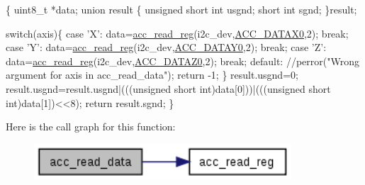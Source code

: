 \begin{DoxyCode}
\{
  uint8\_t *data;
  \textcolor{keyword}{union }result
  \{
    \textcolor{keywordtype}{unsigned} \textcolor{keywordtype}{short} \textcolor{keywordtype}{int} usgnd;
    \textcolor{keywordtype}{short} \textcolor{keywordtype}{int} sgnd;
  \}result;

  \textcolor{keywordflow}{switch}(axis)\{
    \textcolor{keywordflow}{case} \textcolor{charliteral}{'X'}:
      data=\hyperlink{group__acc_ga2a91c44eebbe44f4d3b8c508633512f9}{acc\_read\_reg}(i2c\_dev,\hyperlink{imu__regs_8h_afae448fbad872220013e5c3abf0f3d9f}{ACC\_DATAX0},2);
      \textcolor{keywordflow}{break};
    \textcolor{keywordflow}{case} \textcolor{charliteral}{'Y'}:
      data=\hyperlink{group__acc_ga2a91c44eebbe44f4d3b8c508633512f9}{acc\_read\_reg}(i2c\_dev,\hyperlink{imu__regs_8h_a6aa168a0f3e35bfee4da87c32dcb4b46}{ACC\_DATAY0},2);
      \textcolor{keywordflow}{break};
    \textcolor{keywordflow}{case} \textcolor{charliteral}{'Z'}:
      data=\hyperlink{group__acc_ga2a91c44eebbe44f4d3b8c508633512f9}{acc\_read\_reg}(i2c\_dev,\hyperlink{imu__regs_8h_ab87ce2339aeb4adb7fb71daa80f3bc68}{ACC\_DATAZ0},2);
      \textcolor{keywordflow}{break};
    \textcolor{keywordflow}{default}:
      \textcolor{comment}{//perror("Wrong argument for axis in acc\_read\_data");}
      \textcolor{keywordflow}{return} -1;
  \}
  result.usgnd=0;
  result.usgnd=result.usgnd|(((\textcolor{keywordtype}{unsigned} \textcolor{keywordtype}{short} int)data[0]))|(((\textcolor{keywordtype}{unsigned} \textcolor{keywordtype}{short} \textcolor{keywordtype}{
      int})data[1])<<8);
  \textcolor{keywordflow}{return} result.sgnd;
\}
\end{DoxyCode}


Here is the call graph for this function\-:
\nopagebreak
\begin{figure}[H]
\begin{center}
\leavevmode
\includegraphics[width=272pt]{group__acc_ga041d6953f2bfc8c5efa4d5bbac812305_cgraph}
\end{center}
\end{figure}


